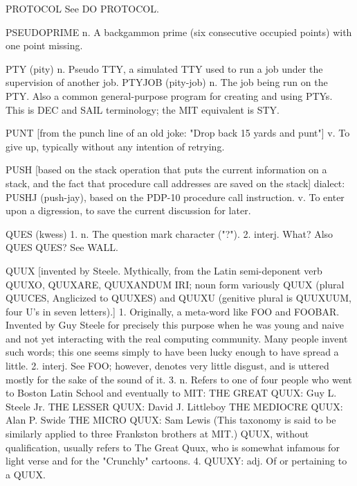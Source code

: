 PROTOCOL  See DO PROTOCOL.

PSEUDOPRIME n. A backgammon prime (six consecutive occupied points)
   with one point missing.

PTY (pity) n. Pseudo TTY, a simulated TTY used to run a job under the
   supervision of another job.
   PTYJOB (pity-job) n. The job being run on the PTY.  Also a common
   general-purpose program for creating and using PTYs.
   This is DEC and SAIL terminology; the MIT equivalent is STY.

PUNT [from the punch line of an old joke: "Drop back 15 yards and
   punt"] v. To give up, typically without any intention of retrying.

PUSH [based on the stack operation that puts the current information
   on a stack, and the fact that procedure call addresses are saved on
   the stack] dialect: PUSHJ (push-jay), based on the PDP-10 procedure
   call instruction.  v. To enter upon a digression, to save the
   current discussion for later.

QUES (kwess) 1. n. The question mark character ("?").  2. interj.
   What?  Also QUES QUES?  See WALL.

QUUX [invented by Steele.  Mythically, from the Latin semi-deponent
   verb QUUXO, QUUXARE, QUUXANDUM IRI; noun form variously QUUX
   (plural QUUCES, Anglicized to QUUXES) and QUUXU (genitive plural is
   QUUXUUM, four U's in seven letters).] 1. Originally, a meta-word
   like FOO and FOOBAR.	 Invented by Guy Steele for precisely this
   purpose when he was young and naive and not yet interacting with
   the real computing community.  Many people invent such words; this
   one seems simply to have been lucky enough to have spread a little.
   2. interj. See FOO; however, denotes very little disgust, and is
   uttered mostly for the sake of the sound of it.  3. n. Refers to
   one of four people who went to Boston Latin School and eventually
   to MIT:
	THE GREAT QUUX:	 Guy L. Steele Jr.
	THE LESSER QUUX:  David J. Littleboy
	THE MEDIOCRE QUUX:  Alan P. Swide
	THE MICRO QUUX:	 Sam Lewis
   (This taxonomy is said to be similarly applied to three Frankston
   brothers at MIT.)  QUUX, without qualification, usually refers to
   The Great Quux, who is somewhat infamous for light verse and for
   the "Crunchly" cartoons.  4. QUUXY: adj. Of or pertaining to a
   QUUX.

